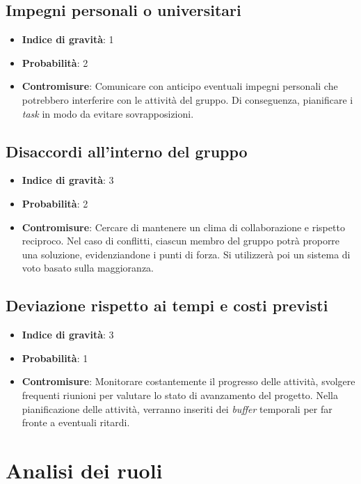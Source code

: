 \documentclass[italian,12pt]{article} %
\begin{document}
\subsection{Impegni personali o universitari}
\begin{itemize}
	\item \textbf{Indice di gravità}: 1
	\item \textbf{Probabilità}: 2
	\item \textbf{Contromisure}: Comunicare con anticipo eventuali impegni personali che potrebbero interferire con le attività del gruppo.
	      Di conseguenza, pianificare i \textit{task} in modo da evitare sovrapposizioni.
\end{itemize}

\subsection{Disaccordi all'interno del gruppo}
\begin{itemize}
	\item \textbf{Indice di gravità}: 3
	\item \textbf{Probabilità}: 2
	\item \textbf{Contromisure}:
	      Cercare di mantenere un clima di collaborazione e rispetto reciproco. Nel caso di conflitti,
	      ciascun membro del gruppo potrà proporre una soluzione, evidenziandone i punti di forza.
	      Si utilizzerà poi un sistema di voto basato sulla maggioranza.
\end{itemize}

\subsection{Deviazione rispetto ai tempi e costi previsti}
\begin{itemize}
	\item \textbf{Indice di gravità}: 3
	\item \textbf{Probabilità}: 1
	\item \textbf{Contromisure}: Monitorare costantemente il progresso delle attività, svolgere frequenti riunioni per valutare lo stato di avanzamento del progetto.
	      Nella pianificazione delle attività, verranno inseriti dei \textit{buffer} temporali per far fronte a eventuali ritardi.

\end{itemize}

\section{Analisi dei ruoli}
\end{document}

